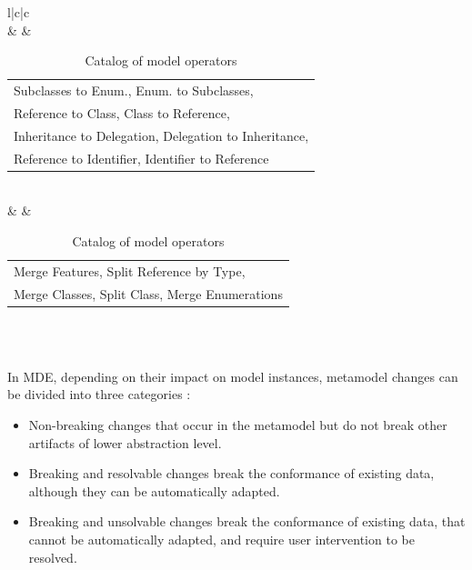 \begin{table}[H]
{{\begin{tabular}{l|c|c}
  			\\   
  			&  
  			&  \begin{tabular}[c]{@{}l@{}} Subclasses to Enum., Enum. to Subclasses,\\ Reference to Class, Class to Reference, \\Inheritance to Delegation, Delegation to Inheritance,\\ Reference to Identifier, Identifier to Reference \end{tabular}
  			\\   
  			&  
  			&  \begin{tabular}[c]{@{}l@{}} Merge Features, Split Reference by Type,\\ Merge Classes, Split Class, Merge Enumerations\\\end{tabular}
  			\\
  			\\
  			\bottomrule
  			
  		\end{tabular}
  	}
  }
  \caption{Catalog of model operators} 
  \label{table:changesCatalog}
  \end{table}
  In MDE, depending on their impact on model instances, metamodel changes can be divided into three categories \cite{gruschko2007towards}:
 \begin{itemize}
 	
 	\item	Non-breaking changes that occur in the metamodel but do not break other artifacts of lower abstraction level.%
 	\item Breaking and resolvable changes break the conformance of existing data, although they can be automatically adapted.
 	\item Breaking and unsolvable changes break the conformance of existing data, that cannot be automatically adapted, and require user intervention to be resolved.
 \end{itemize}
 
